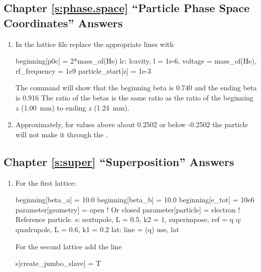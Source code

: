 \documentclass{hitec}     %
\begin{document}
\subsection[Chapter \ref*{s:phase.space.ex} ``Particle Phase Space Coordinates'']{Chapter \hyperref[s:phase.space.ex]{\ref*{s:phase.space}} ``Particle Phase Space Coordinates'' Answers}
\label{s:ans.phase}

\begin{enumerate}[label=\ref*{s:phase.space}.\arabic{enumi}]
\item
In the  lattice file replace the appropriate lines with
\begin{code}
beginning[p0c] = 2*mass_of(He)
lc: lcavity, l = 1e-6, voltage = mass_of(He), rf_frequency = 1e9
particle_start[z] = 1e-3
\end{code}
The command  will show that the beginning beta is 0.740 and the ending beta is 0.916
The ratio of the betas is the same ratio as the ratio of the beginning $z$ (1.00~mm) to ending $z$
(1.24~mm).
%
\item
Approximately, for  values above about 0.2502 or below -0.2502 the particle will not
make it through the .
\end{enumerate}

\subsection[Chapter \ref*{s:super.ex} ``Superposition'']{Chapter \hyperref[s:super.ex]{\ref*{s:super}} ``Superposition'' Answers}
\label{s:ans.super}

\begin{enumerate}[label=\ref*{s:super}.\arabic{enumi}]
\item
For the first lattice:
\begin{code}
beginning[beta_a] = 10.0
beginning[beta_b] = 10.0
beginning[e_tot] = 10e6
parameter[geometry] = open          ! Or closed
parameter[particle] = electron      ! Reference particle.
s: sextupole, L = 0.5, k2 = 1, superimpose, ref = q
q: quadrupole, L = 0.6, k1 = 0.2
lat: line = (q)
use, lat
\end{code}
For the second lattice add the line
\begin{code}
s[create_jumbo_slave] = T
\end{code}
\end{enumerate}
\end{document}
